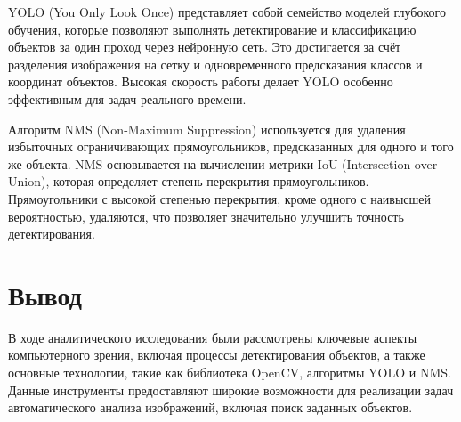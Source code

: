 YOLO (You Only Look Once) представляет собой семейство моделей глубокого обучения, 
которые позволяют выполнять детектирование и классификацию объектов за один проход через нейронную сеть. 
Это достигается за счёт разделения изображения на сетку и одновременного предсказания классов и координат объектов. 
Высокая скорость работы делает YOLO особенно эффективным для задач реального времени.

Алгоритм NMS (Non-Maximum Suppression) используется для удаления избыточных ограничивающих прямоугольников, 
предсказанных для одного и того же объекта. 
NMS основывается на вычислении метрики IoU (Intersection over Union), которая определяет степень перекрытия прямоугольников. 
Прямоугольники с высокой степенью перекрытия, кроме одного с наивысшей вероятностью, удаляются, что позволяет значительно улучшить точность детектирования.

\section*{Вывод}

В ходе аналитического исследования были рассмотрены ключевые аспекты компьютерного зрения, 
включая процессы детектирования объектов, а также основные технологии, такие как библиотека OpenCV, алгоритмы YOLO и NMS. 
Данные инструменты предоставляют широкие возможности для реализации задач автоматического анализа изображений, включая поиск заданных объектов. 

\clearpage

